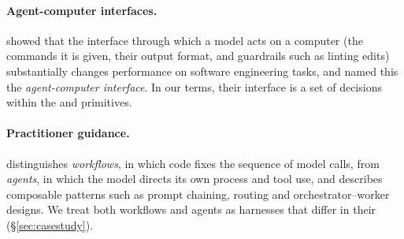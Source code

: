 \paragraph{Agent-computer interfaces.} \citet{yang2024sweagent} showed that the interface through which a model acts on a computer (the commands it is given, their output format, and guardrails such as linting edits) substantially changes performance on software engineering tasks, and named this the \emph{agent-computer interface}. In our terms, their interface is a set of decisions within the  and  primitives.

\paragraph{Practitioner guidance.} \citet{anthropic2024effective} distinguishes \emph{workflows}, in which code fixes the sequence of model calls, from \emph{agents}, in which the model directs its own process and tool use, and describes composable patterns such as prompt chaining, routing and orchestrator--worker designs. We treat both workflows and agents as harnesses that differ in their  (\S\ref{sec:casestudy}).
